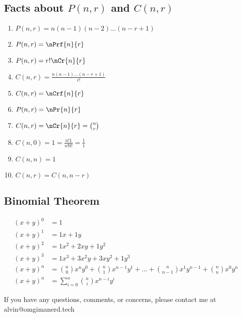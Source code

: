 \documentclass[letterpaper, 12pt]{math}
\begin{document}
\subsection*{Facts about \( P(n,r) \) and \( C(n,r) \)}
\begin{enumerate}
  \item \( P(n,r) = n(n-1)(n-2)\dots(n-r+1) \)
  \item \( P(n,r) = \nPrf{n}{r} \)
  \item \( P(n,r) = r!\nCr{n}{r} \)
  \item \( C(n,r) = \frac{n(n-1)\dots(n-r+1)}{r!} \)
  \item \( C(n,r) = \nCrf{n}{r} \)
  \item \( P(n,r) = {\nPr{n}{r}} \)
  \item \( C(n,r) = {\nCr{n}{r}} = \binom{n}{r} \)
  \item \( C(n,0) = 1 = \frac{n!1}{n!0!} = \frac{1}{1} \)
  \item \( C(n,n) = 1 \)
  \item \( C(n,r) = C(n,n-r) \)
\end{enumerate}

\subsection*{Binomial Theorem}
\begin{align*}
  (x+y)^{0} &= 1 \\
  (x+y)^{1} &= 1x+1y \\
  (x+y)^{2} &= 1x^{2}+2xy+1y^{2} \\
  (x+y)^{3} &= 1x^{3}+3x^{2}y+3xy^{2}+1y^{3} \\
  (x+y)^{n} &= \binom{n}{0}x^{n}y^{0}+\binom{n}{1}x^{n-1}y^{1}+\dots+
      \binom{n}{n-1}x^{1}y^{n-1}+\binom{n}{n}x^{0}y^{n} \\
  (x+y)^{n} &= \sum_{i=0}^{n}\binom{n}{i}x^{n-i}y^{i}
\end{align*}

\begin{center}
  If you have any questions, comments, or concerns, please contact me at
  alvin@omgimanerd.tech
\end{center}
\end{document}
